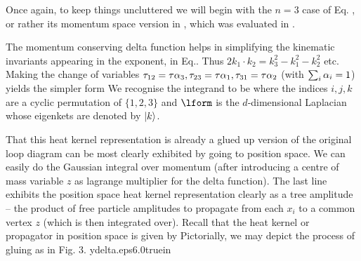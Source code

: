 Once again, to keep things uncluttered we will
begin with the $n=3$ case of Eq. \nptdef , or rather its momentum space version in \wlnpt ,
which was evaluated in \wlint .
\eqn{}

The momentum conserving delta function  
helps in simplifying the kinematic invariants appearing in the exponent, in
Eq.\thrpt . Thus $2k_1\cdot k_2=k_3^2-k_1^2-k_2^2$ etc. Making the change of variables
${\tau}_{12}={\tau}{\alpha}_3, {\tau}_{23}={\tau}{\alpha}_1, {\tau}_{31}={\tau}{\alpha}_2$ (with $\sum_i{\alpha}_i=1$) yields the 
simpler form
\eqn{}
We recognise the integrand to be 
\eqn{}
where the indices $i,j,k$ are a cyclic permutation of $\{1,2,3\}$
and $\lform$ is the $d$-dimensional Laplacian whose eigenkets are denoted by $|k\rangle$.

That this heat kernel representation
is already a glued up version of the original loop diagram can be most clearly 
exhibited by going to position space. We can easily do the Gaussian integral over momentum
(after introducing a centre of mass 
variable $z$ as lagrange multiplier for the delta function).
\eqn{} 
The last line exhibits the position space heat kernel representation clearly as a 
tree amplitude -- the product of free particle amplitudes to propagate from each $x_i$ to
a common vertex $z$ (which is then integrated over).  
Recall that the heat kernel or propagator in position space is
given by
\eqn{}
Pictorially, we may depict the process of gluing as in Fig. 3.
%
{ydelta.eps}{6.0truein}
%

